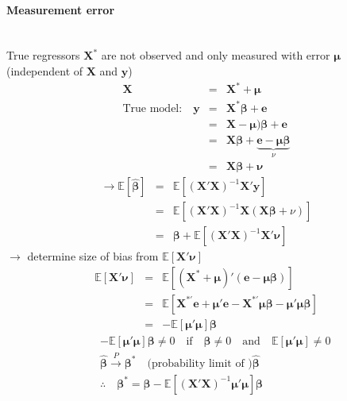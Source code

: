 \paragraph{Measurement error} ~\\
True regressors $\boldsymbol{X^{*}}$ are not observed and only measured with error $\boldsymbol{\mu}$ (independent of $\boldsymbol{X}$ and $\boldsymbol{y}$)
\begin{eqnarray*}
\boldsymbol{X} &=& \boldsymbol{X^{*}}+\boldsymbol{\mu}\\
\text{True model:}\quad \boldsymbol{y} &=& \boldsymbol{X^{*}\beta}+\boldsymbol{e}\\
&=& \boldsymbol{X}-\boldsymbol{\mu})\boldsymbol{\beta}+\boldsymbol{e}\\
&=& \boldsymbol{X\beta}+\underbrace{\boldsymbol{e}-\boldsymbol{\mu\beta}}_{\nu}\\
&=& \boldsymbol{X\beta}+\boldsymbol{\nu}
\end{eqnarray*}
\begin{eqnarray*}
\to \mathbb{E}[\boldsymbol{\hat{\beta}}] &=& \mathbb{E}[(\boldsymbol{X'X})^{-1}\boldsymbol{X'y}]\\
&=& \mathbb{E}[(\boldsymbol{X'X})^{-1}\boldsymbol{X}(\boldsymbol{X\beta}+\nu)]\\
&=& \boldsymbol{\beta} + \mathbb{E}[(\boldsymbol{X'X})^{-1}\boldsymbol{X'\nu}]
\end{eqnarray*}
$\to$ determine size of bias from $\mathbb{E}[\boldsymbol{X'\nu}]$
\begin{eqnarray*}
\mathbb{E}[\boldsymbol{X'\nu}] &=& \mathbb{E}[(\boldsymbol{X^{*}+\mu})'(\boldsymbol{e-\mu\beta})]\\
&=& \mathbb{E}[\boldsymbol{X^{*'}e}+\boldsymbol{\mu'e}-\boldsymbol{X^{*'}\mu\beta}-\boldsymbol{\mu'\mu\beta}]\\
&=& -\mathbb{E}[\boldsymbol{\mu'\mu}]\boldsymbol{\beta}
\end{eqnarray*}
\begin{eqnarray*}
&& -\mathbb{E}[\boldsymbol{\mu'\mu}]\boldsymbol{\beta}\neq 0\quad\text{if}\quad \boldsymbol{\beta}\neq 0\quad\text{and}\quad\mathbb{E}[\boldsymbol{\mu'\mu}]\neq 0\\
&& \boldsymbol{\hat{\beta}}\xrightarrow{P}\boldsymbol{\beta^{*}}\quad\text{(probability limit of )}\boldsymbol{\hat{\beta}}\\
&& \therefore\quad\boldsymbol{\beta^{*}}=\boldsymbol{\beta}-\mathbb{E}[(\boldsymbol{X'X})^{-1}\boldsymbol{\mu'\mu}]\boldsymbol{\beta}
\end{eqnarray*}

